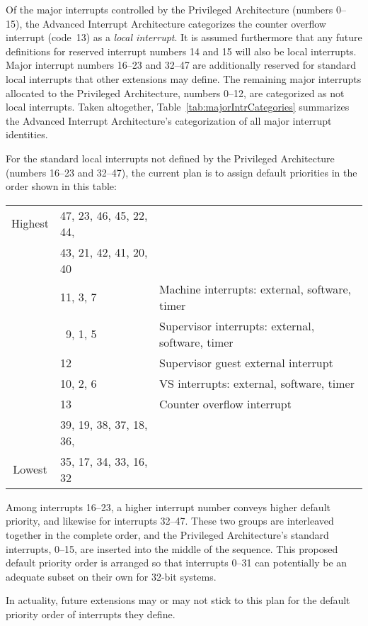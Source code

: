 Of the major interrupts controlled by the Privileged Architecture
(numbers 0--15), the Advanced Interrupt Architecture categorizes the
counter overflow interrupt (code~13) as a \emph{local interrupt}.
It is assumed furthermore that any future definitions for
reserved interrupt numbers 14 and 15 will also be local interrupts.
Major interrupt numbers 16--23 and 32--47 are additionally reserved for
standard local interrupts that other {\RISCV} extensions may define.
The remaining major interrupts allocated to the Privileged
Architecture, numbers 0--12, are categorized as not local interrupts.
Taken altogether, Table~\ref{tab:majorIntrCategories}
summarizes the Advanced Interrupt Architecture's categorization
of all major interrupt identities.

\begin{commentary}
For the standard local interrupts not defined by the
{\RISCV} Privileged Architecture (numbers 16--23 and 32--47),
the current plan is to assign default priorities
in the order shown in this table:
\begin{center}
\begin{tabular}{|c|l|l|}
\hline
Highest & 47, 23, 46, 45, 22, 44, & \\
        & 43, 21, 42, 41, 20, 40  & \\
\cline{2-3}
        & 11, 3, 7   & Machine interrupts:  external, software, timer \\
        & \ 9, 1, 5  & Supervisor interrupts:  external, software, timer \\
        & 12         & Supervisor guest external interrupt \\
        & 10, 2, 6   & VS interrupts:  external, software, timer \\
        & 13         & Counter overflow interrupt \\
\cline{2-3}
        & 39, 19, 38, 37, 18, 36, & \\
Lowest  & 35, 17, 34, 33, 16, 32  & \\
\hline
\end{tabular}
\end{center}
Among interrupts 16--23, a higher interrupt number conveys
higher default priority, and likewise for interrupts 32--47.
These two groups are interleaved together in the complete order,
and the Privileged Architecture's standard interrupts, 0--15,
are inserted into the middle of the sequence.
This proposed default priority order is arranged so that
interrupts 0--31 can potentially be an adequate subset on their
own for \mbox{32-bit} {\RISCV} systems.

In actuality, future {\RISCV} extensions may or may not stick to
this plan for the default priority order of interrupts they define.
\end{commentary}

